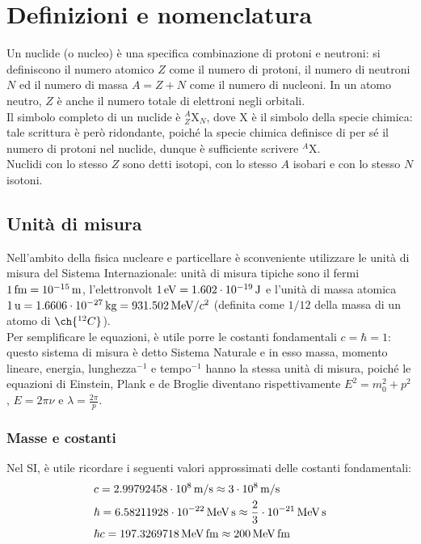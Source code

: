 \section{Definizioni e nomenclatura}

Un nuclide (o nucleo) è una specifica combinazione di protoni e neutroni: si definiscono il numero atomico $ Z $ come il numero di protoni, il numero di neutroni $ N $ ed il numero di massa $ A = Z + N $ come il numero di nucleoni. In un atomo neutro, $ Z $ è anche il numero totale di elettroni negli orbitali.\\
Il simbolo completo di un nuclide è $ ^A_Z \text{X}_N $, dove $ \text{X} $ è il simbolo della specie chimica: tale scrittura è però ridondante, poiché la specie chimica definisce di per sé il numero di protoni nel nuclide, dunque è sufficiente scrivere $ ^A \text{X} $.\\
Nuclidi con lo stesso $ Z $ sono detti isotopi, con lo stesso $ A $ isobari e con lo stesso $ N $ isotoni.

\subsection{Unità di misura}

Nell'ambito della fisica nucleare e particellare è sconveniente utilizzare le unità di misura del Sistema Internazionale: unità di misura tipiche sono il fermi $ 1\,\text{fm} = 10^{-15}\,\text{m} $, l'elettronvolt $ 1\,\text{eV} = 1.602\cdot10^{-19}\,\text{J} $ e l'unità di massa atomica $ 1\,\text{u} = 1.6606\cdot10^{-27}\,\text{kg} = 931.502 \,\text{MeV}/c^2 $ (definita come $ 1/12 $ della massa di un atomo di $ \ch{^{12}C} $).\\
Per semplificare le equazioni, è utile porre le costanti fondamentali $ c = \hbar = 1 $: questo sistema di misura è detto Sistema Naturale e in esso massa, momento lineare, energia, lunghezza$ ^{-1} $ e tempo$ ^{-1} $ hanno la stessa unità di misura, poiché le equazioni di Einstein, Plank e de Broglie diventano rispettivamente $ E^2 = m_0^2 + p^2 $, $ E = 2\pi \nu $ e $ \lambda = \frac{2\pi}{p} $.

\subsubsection{Masse e costanti}

Nel SI, è utile ricordare i seguenti valori approssimati delle costanti fondamentali:
\begin{equation*}
    \begin{split}
	  &c = 2.99792458\cdot10^8 \,\text{m}/\text{s} \approx 3\cdot10^8 \,\text{m}/\text{s}\\
	  &\hbar = 6.58211928\cdot10^{-22} \,\text{MeV}\,\text{s} \approx \frac{2}{3}\cdot10^{-21} \,\text{MeV}\,\text{s}\\
	  &\hbar c = 197.3269718 \,\text{MeV}\,\text{fm} \approx 200 \,\text{MeV}\,\text{fm}
    \end{split}
\end{equation*}


